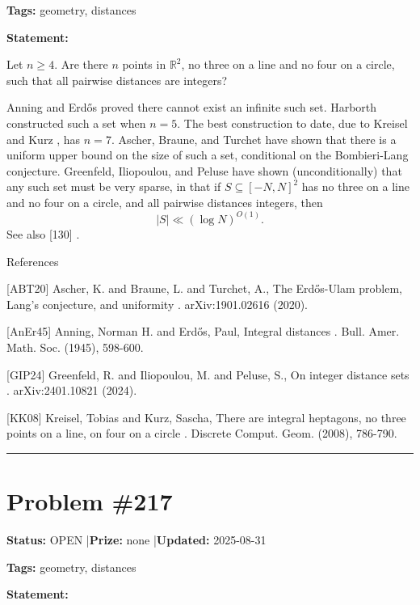 \documentclass{article}
\begin{document}
\noindent\textbf{Tags:} geometry, distances

\medskip

\noindent\textbf{Statement:}

Let $n\geq 4$. Are there $n$ points in $\mathbb{R}^2$, no three on a line and no four on a circle, such that all pairwise distances are integers?




Anning and Erd\H{o}s \cite{AnEr45} proved there cannot exist an infinite such set. Harborth constructed such a set when $n=5$. The best construction to date, due to Kreisel and Kurz \cite{KK08}, has $n=7$. Ascher, Braune, and Turchet \cite{ABT20} have shown that there is a uniform upper bound on the size of such a set, conditional on the Bombieri-Lang conjecture. Greenfeld, Iliopoulou, and Peluse \cite{GIP24} have shown (unconditionally) that any such set must be very sparse, in that if $S\subseteq [-N,N]^2$ has no three on a line and no four on a circle, and all pairwise distances integers, then\[\lvert S\rvert \ll (\log N)^{O(1)}.\]See also [130] .




References

[ABT20] Ascher, K. and Braune, L. and Turchet, A., The Erd\H{o}s-Ulam problem, Lang's conjecture, and uniformity . arXiv:1901.02616 (2020).

[AnEr45] Anning, Norman H. and Erd\H{o}s, Paul, Integral distances . Bull. Amer. Math. Soc. (1945), 598-600.

[GIP24] Greenfeld, R. and Iliopoulou, M. and Peluse, S., On integer distance sets . arXiv:2401.10821 (2024).

[KK08] Kreisel, Tobias and Kurz, Sascha, There are integral heptagons, no three points on a line, on four on a circle . Discrete Comput. Geom. (2008), 786-790.

\noindent\rule{\linewidth}{0.4pt}


\section{Problem \#217}
\label{prob:217}

\noindent\textbf{Status:} OPEN \quad|\quad \textbf{Prize:} none \quad|\quad \textbf{Updated:} 2025-08-31

\noindent\textbf{Tags:} geometry, distances

\medskip

\noindent\textbf{Statement:}
\end{document}
